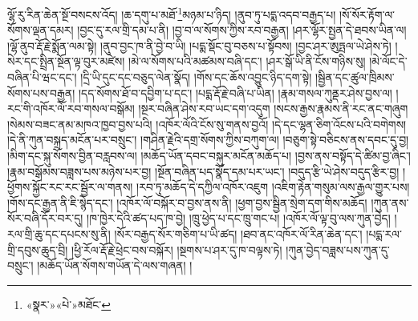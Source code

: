 ལྷོ་རུ་རིན་ཆེན་སྔོ་བསངས་འོད། །ཆ་དགུ་པ་མཐོ་\footnote{«སྣར་»«པེ་»མཐོང་}མཉམ་པ་ཉིད། །ནུབ་ཏུ་པདྨ་འདབ་བརྒྱད་པ། །སོ་སོར་རྟོག་ལ་སོགས་ལྡན་དམར། །བྱང་དུ་རལ་གྲི་དམ་པ་ནི། །བྱ་བ་ལ་སོགས་ཀྱིས་རབ་བརྒྱན། །ཤར་ལྷོར་སྤྱན་དེ་ཐབས་ཡིན་ལ། །ལྷོ་ནུབ་རྡོ་རྗེ་སྨོན་ལམ་སྟེ། །ནུབ་བྱང་ཁ་ནི་བྱེ་བ་ཡི། །པདྨ་སྡོང་བུ་བཅས་པ་སྟོབས། །བྱང་ཤར་ཨུཏྤལ་ཡེ་ཤེས་ཏེ། །སེར་དང་སྤྲིན་སྔོན་ལྟ་བུར་མཛེས། །མེ་ལ་སོགས་པའི་མཚམས་བཞི་དང་། །ཤར་སྒོ་ཡི་ནི་ངོས་གཉིས་སུ། །མེ་ལོང་དེ་བཞིན་པི་ཝང་དང་། །དྲི་ཡི་དུང་དང་བཅུད་ལེན་སྣོད། །གོས་དང་ཆོས་འབྱུང་ཉིད་དག་སྟེ། །སྦྱིན་དང་ཚུལ་ཁྲིམས་སོགས་པས་བརྒྱན། །དད་སོགས་ཐོ་བ་དབྱིག་པ་དང་། །པདྨ་རྡོ་རྗེ་བཞི་པ་ཡིན། །རྣམ་གསལ་ཀུནྡར་ཤེས་བྱས་ལ། །རང་གི་འཁོར་ལོ་རབ་གསལ་བསྒོམ། །སྔར་བཞིན་ཤེས་རབ་ཡང་དག་འདུག །སངས་རྒྱས་རྣམས་ནི་རང་ནང་གཞུག །སེམས་བཟང་ནམ་མཁའ་ཁྱབ་བྱས་པའི། །འཁོར་ལོའི་ངོས་སུ་གནས་བྱའོ། །དེ་དང་ལྷན་ཅིག་འོངས་པའི་བགེགས། །དེ་ནི་ཀུན་བསྐྲད་མངོན་པར་བསྲུང་། །གཤིན་རྗེའི་དགྲ་སོགས་ཀྱིས་བཀུག་ལ། །བཅུག་སྟེ་བཅིངས་ནས་དབང་དུ་བྱ། །མིག་དང་སྐུ་སོགས་བྱིན་བརླབས་ལ། །མཆོད་ཡོན་དབང་བསྐུར་མངོན་མཆོད་པ། །བྱས་ནས་བསྟོད་དེ་ཚིམ་བྱ་ཞིང་། །རྣམ་བསྒོམས་བཟླས་པས་མཉེས་པར་བྱ། །སྔོན་བཞིན་པད་སྣོད་དམ་པར་ཡང་། །བདུད་རྩི་ཡེ་ཤེས་བདུད་རྩིར་བྱ། །ཕྱོགས་སྐྱོང་རང་རང་སྦྱོར་ལ་གནས། །རབ་ཏུ་མཆོད་དེ་དཀྱིལ་འཁོར་འཇུག །འཇིག་རྟེན་གསུམ་ལས་རྒྱལ་གྱུར་པས། །གོས་དང་རྒྱན་ནི་ཇི་སྙེད་དང་། །འཁོར་ལོ་བསྐོར་བ་བྱས་ནས་ནི། །ཕྱག་བྱས་སྦྱིན་སྲེག་དག་གིས་མཆོད། །ཀུན་ནས་སོར་བཞི་དོར་བར་དུ། །ཁ་ཁྱེར་དེའི་ཚད་པད་ཁ་བྱེ། །ཁྲུ་ཕྱེད་པ་དང་ཁྲུ་གང་པ། །འཁོར་ལོ་ལྟ་བུ་ལས་ཀུན་བྱེད། །རལ་གྲི་ཆུ་དང་དཔངས་སུ་ནི། །སོར་བརྒྱད་སོར་གཅིག་པ་ཡི་ཚད། །ཐབ་ནང་འཁོར་ལོ་རིན་ཆེན་དང་། །པདྨ་རལ་གྲི་དབུས་ཆུད་བྲི། །ཕྱི་རོལ་རྡོ་རྗེ་ཕྲེང་བས་བསྐོར། །སྔགས་པ་ཤར་དུ་ཁ་བལྟས་ཏེ། །ཀུན་བྱེད་བཟླས་པས་ཀུན་དུ་བསྲུང་། །མཆོད་ཡོན་སོགས་གཡོན་དེ་ལས་གཞན། །
